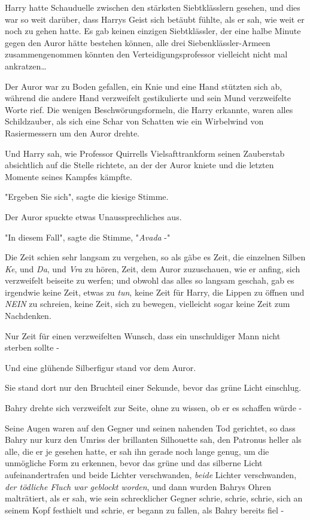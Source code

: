 {Harry hatte Schauduelle zwischen den stärksten Siebtklässlern gesehen, und dies war so weit darüber, dass Harrys Geist sich betäubt fühlte, als er sah, wie weit er noch zu gehen hatte. Es gab keinen einzigen Siebtklässler, der eine halbe Minute gegen den Auror hätte bestehen können, alle drei Siebenklässler-Armeen zusammengenommen könnten den Verteidigungsprofessor vielleicht nicht mal ankratzen…

Der Auror war zu Boden gefallen, ein Knie und eine Hand stützten sich ab, während die andere Hand verzweifelt gestikulierte und sein Mund verzweifelte Worte rief. Die wenigen Beschwörungsformeln, die Harry erkannte, waren alles Schildzauber, als sich eine Schar von Schatten wie ein Wirbelwind von Rasiermessern um den Auror drehte.

Und Harry sah, wie Professor Quirrells Vielsafttrankform seinen Zauberstab absichtlich auf die Stelle richtete, an der der Auror kniete und die letzten Momente seines Kampfes kämpfte.

"Ergeben Sie sich", sagte die kiesige Stimme.

Der Auror spuckte etwas Unaussprechliches aus.

"In diesem Fall", sagte die Stimme, "\emph{Avada} -"

Die Zeit schien sehr langsam zu vergehen, so als gäbe es Zeit, die einzelnen Silben \emph{Ke}, und \emph{Da}, und \emph{Vra} zu hören, Zeit, dem Auror zuzuschauen, wie er anfing, sich verzweifelt beiseite zu werfen; und obwohl das alles so langsam geschah, gab es irgendwie keine Zeit, etwas zu \emph{tun}, keine Zeit für Harry, die Lippen zu öffnen und \emph{NEIN} zu schreien, keine Zeit, sich zu bewegen, vielleicht sogar keine Zeit zum Nachdenken.

Nur Zeit für einen verzweifelten Wunsch, dass ein unschuldiger Mann nicht sterben sollte -

Und eine glühende Silberfigur stand vor dem Auror.

Sie stand dort nur den Bruchteil einer Sekunde, bevor das grüne Licht einschlug.

Bahry drehte sich verzweifelt zur Seite, ohne zu wissen, ob er es schaffen würde -

Seine Augen waren auf den Gegner und seinen nahenden Tod gerichtet, so dass Bahry nur kurz den Umriss der brillanten Silhouette sah, den Patronus heller als alle, die er je gesehen hatte, er sah ihn gerade noch lange genug, um die unmögliche Form zu erkennen, bevor das grüne und das silberne Licht aufeinandertrafen und beide Lichter verschwanden, \emph{beide} Lichter verschwanden, \emph{der tödliche Fluch war geblockt worden}, und dann wurden Bahrys Ohren malträtiert, als er sah, wie sein schrecklicher Gegner schrie, schrie, schrie, sich an seinem Kopf festhielt und schrie, er begann zu fallen, als Bahry bereits fiel -

}
